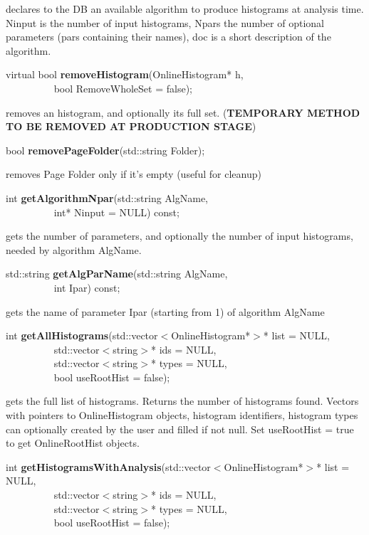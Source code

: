  declares to the DB an available algorithm to produce histograms at
 analysis time. Ninput is the number of input histograms, Npars the
 number of optional parameters (pars containing their names), doc is a short
 description of the algorithm.


\item    virtual bool {\bf removeHistogram}(OnlineHistogram* h,\\\mbox{}~~~~~~~~~
			       bool RemoveWholeSet = false);

 removes an histogram, and optionally its full set. 
 ({\bf TEMPORARY METHOD TO BE REMOVED AT PRODUCTION STAGE})


\item    bool {\bf removePageFolder}(std::string Folder);


 removes Page Folder only if it's empty (useful for cleanup)


\item    int {\bf getAlgorithmNpar}(std::string AlgName,\\\mbox{}~~~~~~~~~
		       int* Ninput = NULL) const;

 gets the number of parameters, and optionally the number of input histograms, needed by algorithm AlgName.


\item    std::string {\bf getAlgParName}(std::string AlgName,\\\mbox{}~~~~~~~~~
		       int Ipar) const;

 gets the name of parameter Ipar (starting from 1) of algorithm AlgName


\item    int {\bf getAllHistograms}(std::vector$<$OnlineHistogram*$>$* list = NULL,\\\mbox{}~~~~~~~~~
		       std::vector$<$string$>$* ids = NULL,\\\mbox{}~~~~~~~~~
		       std::vector$<$string$>$* types = NULL,\\\mbox{}~~~~~~~~~
		       bool useRootHist = false);

 gets the full list of histograms. Returns the number of histograms found. Vectors with pointers
 to OnlineHistogram objects, histogram identifiers, histogram types can optionally created  by the user
 and filled if not null. Set useRootHist = true to get OnlineRootHist objects.


\item    int {\bf getHistogramsWithAnalysis}(std::vector$<$OnlineHistogram*$>$* list = NULL,\\\mbox{}~~~~~~~~~
				std::vector$<$string$>$* ids = NULL,\\\mbox{}~~~~~~~~~
				std::vector$<$string$>$* types = NULL,\\\mbox{}~~~~~~~~~
				bool useRootHist = false);

